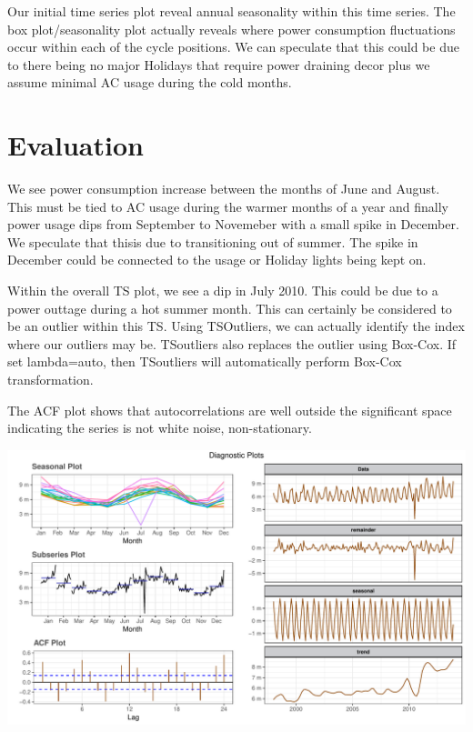 \documentclass[openany]{book}
\begin{document}
Our initial time series plot reveal annual seasonality within this time
series. The box plot/seasonality plot actually reveals where power
consumption fluctuations occur within each of the cycle positions. We
can speculate that this could be due to there being no major Holidays
that require power draining decor plus we assume minimal AC usage during
the cold months.

\hypertarget{evaluation-1}{%
\section{Evaluation}\label{evaluation-1}}

We see power consumption increase between the months of June and August.
This must be tied to AC usage during the warmer months of a year and
finally power usage dips from September to Novemeber with a small spike
in December. We speculate that thisis due to transitioning out of
summer. The spike in December could be connected to the usage or Holiday
lights being kept on.

Within the overall TS plot, we see a dip in July 2010. This could be due
to a power outtage during a hot summer month. This can certainly be
considered to be an outlier within this TS. Using TSOutliers, we can
actually identify the index where our outliers may be. TSoutliers also
replaces the outlier using Box-Cox. If set lambda=auto, then TSoutliers
will automatically perform Box-Cox transformation.

The ACF plot shows that autocorrelations are well outside the
significant space indicating the series is not white noise,
non-stationary.

\includegraphics{Group2_Project1_Fall2019_files/figure-latex/unnamed-chunk-10-1.pdf}
\end{document}
